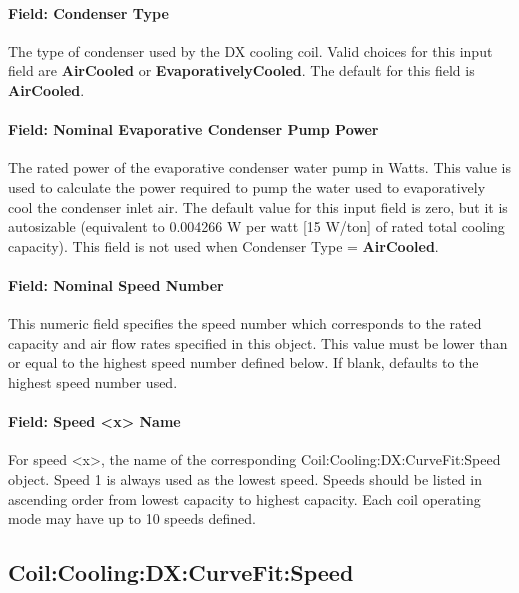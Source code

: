 \paragraph{Field: Condenser Type}\label{field-condenser-type-3}

The type of condenser used by the DX cooling coil. Valid choices for this input field are \textbf{AirCooled} or \textbf{EvaporativelyCooled}. The default for this field is \textbf{AirCooled}.

\paragraph{Field: Nominal Evaporative Condenser Pump Power}\label{field-nominal-evaporative-condenser-pump-power-1}

The rated power of the evaporative condenser water pump in Watts. This value is used to calculate the power required to pump the water used to evaporatively cool the condenser inlet air. The default value for this input field is zero, but it is autosizable (equivalent to 0.004266 W per watt {[}15 W/ton{]} of rated total cooling capacity). This field is not used when Condenser Type = \textbf{AirCooled}.

\paragraph{Field: Nominal Speed Number}\label{field-nominal-speed-number}

This numeric field specifies the speed number which corresponds to the rated capacity and air flow rates specified in this object. This value must be lower than or equal to the highest speed number defined below. If blank, defaults to the highest speed number used.

\paragraph{Field: Speed \textless{}x\textgreater{} Name}\label{field-speed-x-name}

For speed \textless{}x\textgreater{}, the name of the corresponding Coil:Cooling:DX:CurveFit:Speed object. Speed 1 is always used as the lowest speed. Speeds should be listed in ascending order from lowest capacity to highest capacity. Each coil operating mode may have up to 10 speeds defined.

\subsection{Coil:Cooling:DX:CurveFit:Speed}\label{coilcoolingdxcurvefitspeed}

